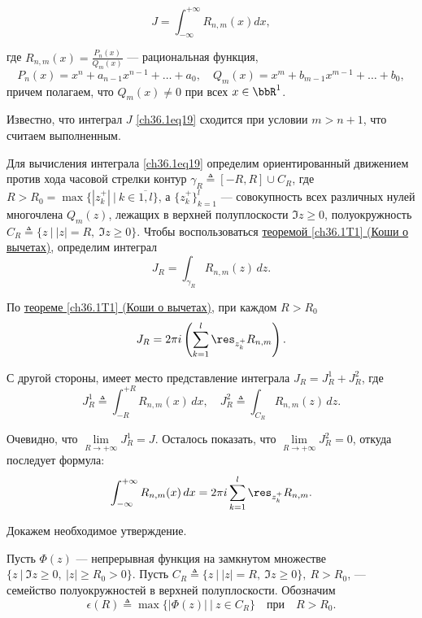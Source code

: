 \begin{leftbar}
\begin{equation} \label{ch36.1eq19}
J = \int_{-\infty}^{+\infty} R_{n,m} (x) dx,
\end{equation}

где $R_{n,m}(x) = \frac{P_n(x)}{Q_m(x)}$ --- рациональная функция,
$$
P_n(x) = x^n + a_{n - 1} x^{n - 1} + \ldots + a_0, \quad
Q_m(x) = x^m + b_{m - 1} x^{m - 1} + \ldots + b_0,
$$
причем полагаем, что $Q_m(x) \not= 0$ при всех $x \in \bbR^1$.

Известно, что интеграл $J$ \eqref{ch36.1eq19} сходится при условии $m > n + 1$, что считаем выполненным.

Для вычисления интеграла \eqref{ch36.1eq19} определим ориентированный движением против хода часовой стрелки контур $\gamma_R \triangleq [-R, R] \cup C_R$, где $R > R_0 = \max\{ |z_k^{+}| \: \big| \: k \in \overline{1,l} \}$, а $ \{ z_{k}^{+} \}^l_{k = 1}$ --- совокупность всех различных нулей многочлена $Q_m(z)$, лежащих в верхней полуплоскости $\Im z \ge 0$, полуокружность $C_R \triangleq \{ z \: \big| \: |z| = R, \: \Im z \ge 0 \}$. Чтобы воспользоваться \hyperref[ch36.1T1]{теоремой \ref{ch36.1T1} (Коши о вычетах)}, определим интеграл 
$$
J_R = \int_{\gamma_R} R_{n,m}(z)\,dz.
$$

По \hyperref[ch36.1T1]{теореме \ref{ch36.1T1} (Коши о вычетах)}, при каждом $R > R_0$
$$
J_R = 2\pi i\left( \sum_{k = 1}^{l} \res_{z_k^+} R_{n,m}\right).
$$

С другой стороны, имеет место представление интеграла $J_R = J_R^1 + J_R^2$, где 
\begin{equation} \label{ch36.1eq20}
J_R^1 \triangleq \int_{-R}^{+R} R_{n,m}(x)\,dx, \quad J_R^2 \triangleq \int_{C_R} R_{n,m}(z)\,dz.
\end{equation}

Очевидно, что $\lim\limits_{R \to +\infty} J_R^1 = J$. Осталось показать, что $\lim\limits_{R \to +\infty}J_R^2 = 0$, откуда последует формула:
\begin{equation} \label{ch36.1eq21}
\int_{-\infty}^{+\infty}R_{n,m}(x)\,dx = 2\pi i\sum_{k = 1}^{l} \res_{z_k^+} R_{n,m}.
\end{equation}

Докажем необходимое утверждение.

\begin{lemm} \label{ch36.1lemm4}
Пусть $\Phi(z)$ --- непрерывная функция на замкнутом множестве $\{ z \: \big| \: \Im z \ge 0, \: |z| \ge R_0 > 0 \}$. Пусть $C_R \triangleq \{ z \: \big| \: |z| = R, \: \Im z \ge 0 \}, \: R > R_0$, --- семейство полуокружностей в верхней полуплоскости. Обозначим
$$
\epsilon(R) \triangleq \max\{|\Phi(z)| \: \big| \: z\in C_R \} \quad \text{при} \quad R > R_0.
$$


\end{lemm}
\end{leftbar}
